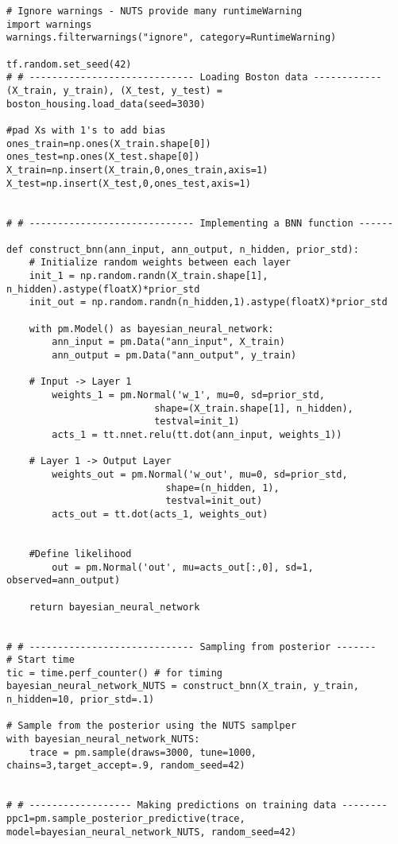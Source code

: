 \begin{appendices}
\begin{lstlisting}
# Ignore warnings - NUTS provide many runtimeWarning
import warnings
warnings.filterwarnings("ignore", category=RuntimeWarning)

tf.random.set_seed(42)
# # ----------------------------- Loading Boston data ------------
(X_train, y_train), (X_test, y_test) = boston_housing.load_data(seed=3030)

#pad Xs with 1's to add bias
ones_train=np.ones(X_train.shape[0])
ones_test=np.ones(X_test.shape[0])
X_train=np.insert(X_train,0,ones_train,axis=1)
X_test=np.insert(X_test,0,ones_test,axis=1)


# # ----------------------------- Implementing a BNN function ------

def construct_bnn(ann_input, ann_output, n_hidden, prior_std):
    # Initialize random weights between each layer
    init_1 = np.random.randn(X_train.shape[1], n_hidden).astype(floatX)*prior_std
    init_out = np.random.randn(n_hidden,1).astype(floatX)*prior_std

    with pm.Model() as bayesian_neural_network:
        ann_input = pm.Data("ann_input", X_train)
        ann_output = pm.Data("ann_output", y_train)
        
    # Input -> Layer 1
        weights_1 = pm.Normal('w_1', mu=0, sd=prior_std,
                          shape=(X_train.shape[1], n_hidden),
                          testval=init_1)
        acts_1 = tt.nnet.relu(tt.dot(ann_input, weights_1))

    # Layer 1 -> Output Layer
        weights_out = pm.Normal('w_out', mu=0, sd=prior_std,
                            shape=(n_hidden, 1),
                            testval=init_out)
        acts_out = tt.dot(acts_1, weights_out)
        

    #Define likelihood
        out = pm.Normal('out', mu=acts_out[:,0], sd=1, observed=ann_output)        
            
    return bayesian_neural_network


# # ----------------------------- Sampling from posterior -------
# Start time
tic = time.perf_counter() # for timing
bayesian_neural_network_NUTS = construct_bnn(X_train, y_train, n_hidden=10, prior_std=.1)

# Sample from the posterior using the NUTS samplper
with bayesian_neural_network_NUTS:
    trace = pm.sample(draws=3000, tune=1000, chains=3,target_accept=.9, random_seed=42)
    

# # ------------------ Making predictions on training data --------
ppc1=pm.sample_posterior_predictive(trace, model=bayesian_neural_network_NUTS, random_seed=42)


\end{lstlisting}
\end{appendices}
